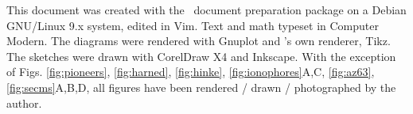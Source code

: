 \newpage
This document was created with the \LaTeXe \, document preparation package on a Debian GNU/Linux 9.x system, edited in Vim. Text and math typeset in Computer Modern.
The diagrams were rendered with Gnuplot and \LaTeXe's  own renderer, Tikz.
The sketches were drawn with CorelDraw X4 and Inkscape.
With the exception of Figs. \ref{fig:pioneers}, \ref{fig:harned}, \ref{fig:hinke}, \ref{fig:ionophores}A,C, \ref{fig:az63}, \ref{fig:secms}A,B,D, all figures have been rendered / drawn / photographed by the author.
